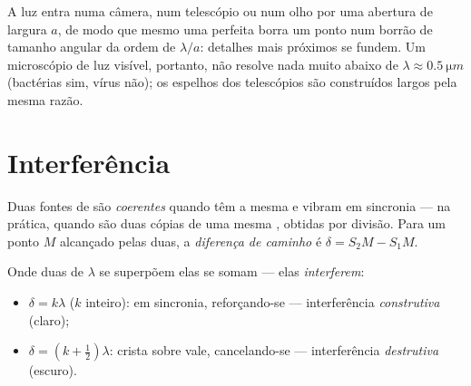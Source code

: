 \begin{remark}\label{rem:g12:light-as-wave:limits}
A luz entra numa câmera, num telescópio ou num olho por uma abertura de
largura $a$, de modo que mesmo uma  perfeita borra um ponto num
borrão de tamanho angular da ordem de $\lambda/a$: detalhes mais próximos
se fundem. Um microscópio de luz visível, portanto, não resolve nada
muito abaixo de $\lambda \approx \qty{0.5}{\micro m}$ (bactérias sim,
vírus não); os espelhos dos telescópios são construídos largos pela mesma
razão.
\end{remark}

\section{Interferência}

\begin{definition}\label{def:g12:light-as-wave:coherent}
Duas fontes de  são \emph{coerentes} quando
têm a mesma  e vibram em sincronia --- na prática, quando são
duas cópias de uma mesma , obtidas por divisão. Para um ponto $M$
alcançado pelas duas, a \emph{diferença de caminho} é $\delta = S_2M - S_1M$.
\end{definition}

\begin{proposition}\label{prop:g12:light-as-wave:conditions}
Onde duas   de  $\lambda$ se superpõem
elas se somam --- elas \emph{interferem}:
\begin{itemize}
  \item $\delta = k\lambda$ ($k$ inteiro): em sincronia, reforçando-se
        --- interferência \emph{construtiva} (claro);
  \item $\delta = (k + \tfrac12)\lambda$: crista sobre vale,
        cancelando-se --- interferência
        \emph{destrutiva} (escuro).
\end{itemize}
\end{proposition}

